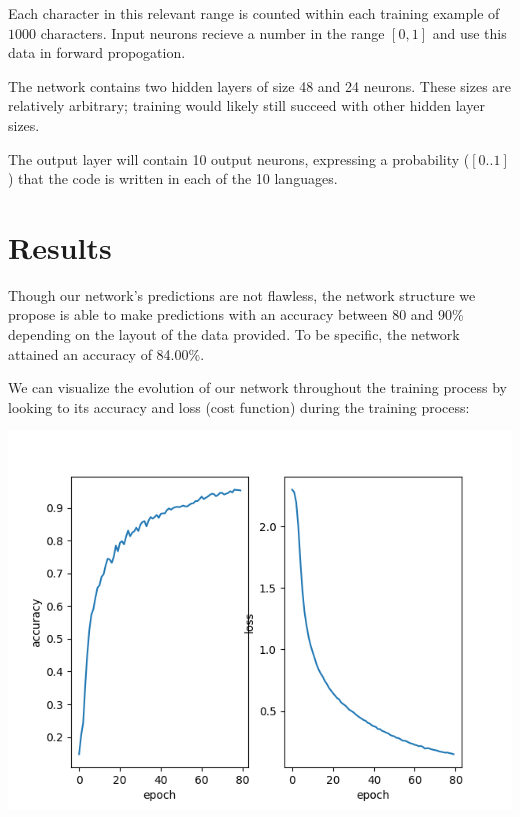 \documentclass{article}
\begin{document}
Each character in this relevant range is counted within each training example of $1000$ characters. Input neurons recieve a number in the range $[0,1]$ and use this data in forward propogation.

The network contains two hidden layers of size 48 and 24 neurons. These sizes are relatively arbitrary; training would likely still succeed with other hidden layer sizes.

The output layer will contain 10 output neurons, expressing a probability ($[0..1]$) that the code is written in each of the 10 languages.

\section{Results}
Though our network's predictions are not flawless, the network structure we propose is able to make predictions with an accuracy between 80 and 90\% depending on the layout of the data provided. To be specific, the network attained an accuracy of 84.00\%.

We can visualize the evolution of our network throughout the training process by looking to its accuracy and loss (cost function) during the training process:

\includegraphics{history}
\end{document}
